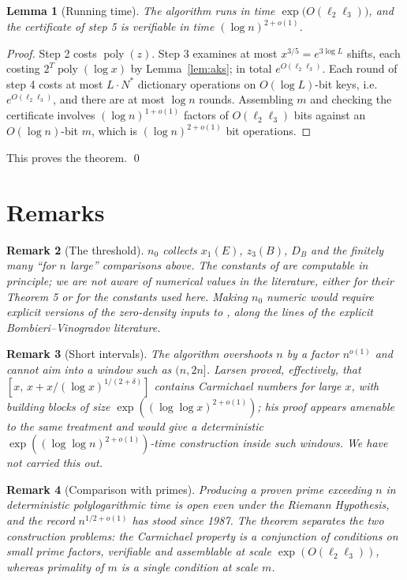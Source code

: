 \documentclass[11pt]{amsart}
\newtheorem{lemma}{Lemma}[section]
\newtheorem{remark}[lemma]{Remark}
\newcommand{\llog}{\log\log}
\begin{document}
\begin{lemma}[Running time]
The algorithm runs in time $\exp\bigl(O(\ell_2\ell_3)\bigr)$, and the
certificate of step 5 is verifiable in time $(\log n)^{2+o(1)}$.
\end{lemma}

\begin{proof}
Step 2 costs $\operatorname{poly}(z)$. Step 3 examines at most
$x^{3/5} = e^{3\log L}$ shifts, each costing
$2^T \operatorname{poly}(\log x)$ by Lemma~\ref{lem:aks}; in total
$e^{O(\ell_2\ell_3)}$. Each round of step 4 costs at most
$L \cdot N^*$ dictionary operations on $O(\log L)$-bit keys, i.e.
$e^{O(\ell_2\ell_3)}$, and there are at most $\log n$ rounds. Assembling
$m$ and checking the certificate involves $(\log n)^{1+o(1)}$ factors of
$O(\ell_2\ell_3)$ bits against an $O(\log n)$-bit $m$, which is
$(\log n)^{2+o(1)}$ bit operations.
\end{proof}

This proves the theorem. \qed

\section{Remarks}

\begin{remark}[The threshold]
$n_0$ collects $x_1(E)$, $z_3(B)$, $D_B$ and the finitely many
``for $n$ large'' comparisons above. The constants of \cite{AGP} are
computable in principle; we are not aware of numerical values in the
literature, either for their Theorem 5 or for the constants used here.
Making $n_0$ numeric would require explicit
versions of the zero-density inputs to \cite{AGP}, along the lines of
the explicit Bombieri--Vinogradov literature.
\end{remark}

\begin{remark}[Short intervals]
\label{rem:larsen}
The algorithm overshoots $n$ by a factor $n^{o(1)}$ and cannot aim into
a window such as $(n, 2n]$. Larsen \cite{Lar} proved, effectively, that
$[x,\, x + x/(\log x)^{1/(2+\delta)}]$ contains Carmichael numbers for
large $x$, with building blocks of size
$\exp((\llog x)^{2+o(1)})$; his proof appears amenable to the same
treatment and would give a deterministic
$\exp((\llog n)^{2+o(1)})$-time construction inside such windows. We
have not carried this out.
\end{remark}

\begin{remark}[Comparison with primes]
Producing a proven prime exceeding $n$ in deterministic
polylogarithmic time is open even under the Riemann Hypothesis, and the
record $n^{1/2+o(1)}$ \cite{LO, Pol} has stood since 1987. The theorem
separates the two construction problems: the Carmichael property is a
conjunction of conditions on small prime factors, verifiable and
assemblable at scale $\exp(O(\ell_2 \ell_3))$, whereas primality of $m$
is a single condition at scale $m$.
\end{remark}
\end{document}
